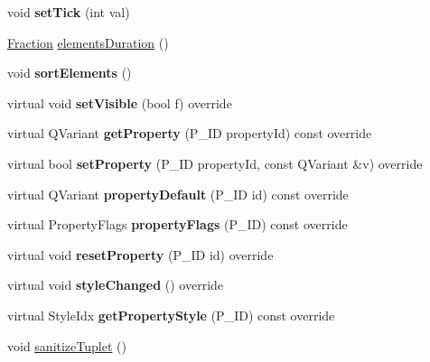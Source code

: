 \begin{DoxyCompactItemize}
void {\bfseries set\+Tick} (int val)
\item 
\hyperlink{class_ms_1_1_fraction}{Fraction} \hyperlink{class_ms_1_1_tuplet_a009956c2b46a1077ea5e010923a76e59}{elements\+Duration} ()
\item 
\mbox{\label{class_ms_1_1_tuplet_ad345e0189a405aa4f4ffbd8405bc0b39}} 
void {\bfseries sort\+Elements} ()
\item 
\mbox{\label{class_ms_1_1_tuplet_a02a00deed920e260bd815c857e536e22}} 
virtual void {\bfseries set\+Visible} (bool f) override
\item 
\mbox{\label{class_ms_1_1_tuplet_aecb6358e027c469a591b99b87de03169}} 
virtual Q\+Variant {\bfseries get\+Property} (P\+\_\+\+ID property\+Id) const override
\item 
\mbox{\label{class_ms_1_1_tuplet_a16fe01f2671178303cf47b4ae0572bd8}} 
virtual bool {\bfseries set\+Property} (P\+\_\+\+ID property\+Id, const Q\+Variant \&v) override
\item 
\mbox{\label{class_ms_1_1_tuplet_a80fa694fe3060906a8f1a026b6e75365}} 
virtual Q\+Variant {\bfseries property\+Default} (P\+\_\+\+ID id) const override
\item 
\mbox{\label{class_ms_1_1_tuplet_aa9f48721fdb03aaaf9985dd06a751bdc}} 
virtual Property\+Flags {\bfseries property\+Flags} (P\+\_\+\+ID) const override
\item 
\mbox{\label{class_ms_1_1_tuplet_a8bc3c4fcab3d1e0757cb8016664a266f}} 
virtual void {\bfseries reset\+Property} (P\+\_\+\+ID id) override
\item 
\mbox{\label{class_ms_1_1_tuplet_a23deaa2e541117db15e66810bfbb11b4}} 
virtual void {\bfseries style\+Changed} () override
\item 
\mbox{\label{class_ms_1_1_tuplet_a833f28e46186996c55ce2cae34df2d97}} 
virtual Style\+Idx {\bfseries get\+Property\+Style} (P\+\_\+\+ID) const override
\item 
void \hyperlink{class_ms_1_1_tuplet_a8f4710eeec93bae31c56098304569c01}{sanitize\+Tuplet} ()
\end{DoxyCompactItemize}
